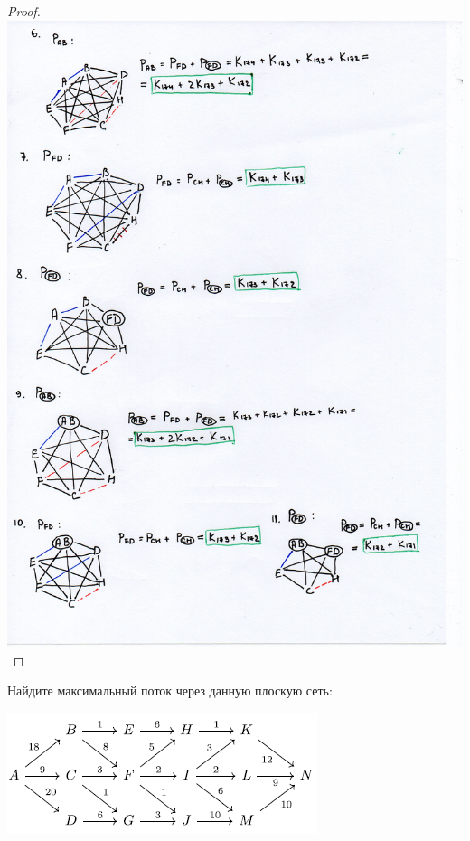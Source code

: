 \begin{proof}
    \centering\includegraphics[width=1\linewidth]{pics/12thSolution1.jpg}

\end{proof}

\begin{problem}[13]

	Найдите максимальный поток через данную плоскую сеть:
    
    \centering\includegraphics[width=0.5\linewidth]{pics/13thGraph.png}
    
\end{problem}


